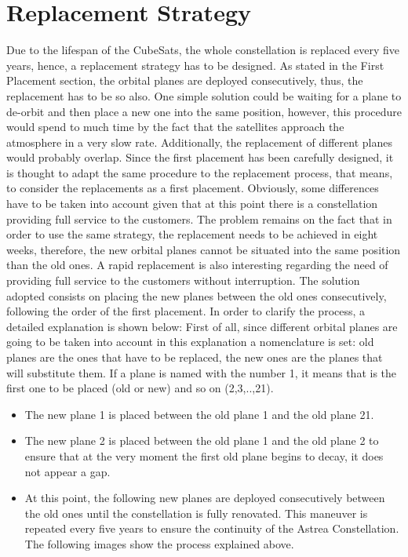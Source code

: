 \section{Replacement Strategy}
Due to the lifespan of the CubeSats, the whole constellation is replaced every five years, hence, a replacement strategy has to be designed. As stated in the First Placement section, the orbital planes are deployed consecutively, thus, the replacement has to be so also. One simple solution could be waiting for a plane to de-orbit and then place a new one into the same position, however, this procedure would spend to much time by the fact that the satellites approach the atmosphere in a very slow rate. Additionally, the replacement of different planes would probably overlap. Since the first placement has been carefully designed, it is thought to adapt the same procedure to the replacement process, that means, to consider the replacements as a first placement. Obviously, some differences have to be taken into account given that at this point there is a constellation providing full service to the customers. The problem remains on the fact that in order to use the same strategy, the replacement needs to be achieved in eight weeks, therefore, the new orbital planes cannot be situated into the same position than the old ones. A rapid replacement is also interesting regarding the need of providing full service to the customers without interruption. The solution adopted consists on placing the new planes between the old ones consecutively, following the order of the first placement. In order to clarify the process, a detailed explanation is shown below:
\newline
First of all, since different orbital planes are going to be taken into account in this explanation a nomenclature is set: old planes are the ones that have to be replaced, the new ones are the planes that will substitute them. If a plane is named with the number 1, it means that is the first one to be placed (old or new) and so on (2,3,..,21). 
\begin{itemize}
\item The new plane 1 is placed between the old plane 1 and the old plane 21.
\item The new plane 2 is placed between the old plane 1 and the old plane 2 to ensure that at the very moment the first old plane begins to decay, it does not appear a gap.
\item At this point, the following new planes are deployed consecutively between the old ones until the constellation is fully renovated. This maneuver is repeated every five years to ensure the continuity of the Astrea Constellation. 
The following images show the process explained above.
\end{itemize}
